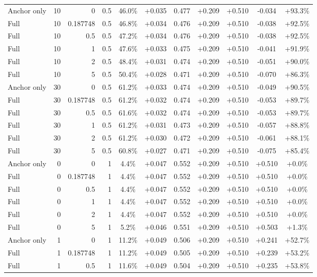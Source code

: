 \begin{table}[htbp]
\begin{tabular}{lrrrccccccc}
Anchor only & 10 & 0 & 0.5 & 46.0\% & +0.035 & 0.477 & +0.209 & +0.510 & -0.034 & +93.3\% \\
Full & 10 & 0.187748 & 0.5 & 46.8\% & +0.034 & 0.476 & +0.209 & +0.510 & -0.038 & +92.5\% \\
Full & 10 & 0.5 & 0.5 & 47.2\% & +0.034 & 0.476 & +0.209 & +0.510 & -0.038 & +92.5\% \\
Full & 10 & 1 & 0.5 & 47.6\% & +0.033 & 0.475 & +0.209 & +0.510 & -0.041 & +91.9\% \\
Full & 10 & 2 & 0.5 & 48.4\% & +0.031 & 0.474 & +0.209 & +0.510 & -0.051 & +90.0\% \\
Full & 10 & 5 & 0.5 & 50.4\% & +0.028 & 0.471 & +0.209 & +0.510 & -0.070 & +86.3\% \\
Anchor only & 30 & 0 & 0.5 & 61.2\% & +0.033 & 0.474 & +0.209 & +0.510 & -0.049 & +90.5\% \\
Full & 30 & 0.187748 & 0.5 & 61.2\% & +0.032 & 0.474 & +0.209 & +0.510 & -0.053 & +89.7\% \\
Full & 30 & 0.5 & 0.5 & 61.6\% & +0.032 & 0.474 & +0.209 & +0.510 & -0.053 & +89.7\% \\
Full & 30 & 1 & 0.5 & 61.2\% & +0.031 & 0.473 & +0.209 & +0.510 & -0.057 & +88.8\% \\
Full & 30 & 2 & 0.5 & 61.2\% & +0.030 & 0.472 & +0.209 & +0.510 & -0.061 & +88.1\% \\
Full & 30 & 5 & 0.5 & 60.8\% & +0.027 & 0.471 & +0.209 & +0.510 & -0.075 & +85.4\% \\
Anchor only & 0 & 0 & 1 & 4.4\% & +0.047 & 0.552 & +0.209 & +0.510 & +0.510 & +0.0\% \\
Full & 0 & 0.187748 & 1 & 4.4\% & +0.047 & 0.552 & +0.209 & +0.510 & +0.510 & +0.0\% \\
Full & 0 & 0.5 & 1 & 4.4\% & +0.047 & 0.552 & +0.209 & +0.510 & +0.510 & +0.0\% \\
Full & 0 & 1 & 1 & 4.4\% & +0.047 & 0.552 & +0.209 & +0.510 & +0.510 & +0.0\% \\
Full & 0 & 2 & 1 & 4.4\% & +0.047 & 0.552 & +0.209 & +0.510 & +0.510 & +0.0\% \\
Full & 0 & 5 & 1 & 5.2\% & +0.046 & 0.551 & +0.209 & +0.510 & +0.503 & +1.3\% \\
Anchor only & 1 & 0 & 1 & 11.2\% & +0.049 & 0.506 & +0.209 & +0.510 & +0.241 & +52.7\% \\
Full & 1 & 0.187748 & 1 & 11.2\% & +0.049 & 0.505 & +0.209 & +0.510 & +0.239 & +53.2\% \\
Full & 1 & 0.5 & 1 & 11.6\% & +0.049 & 0.504 & +0.209 & +0.510 & +0.235 & +53.8\% \\

\end{tabular}
\end{table}
